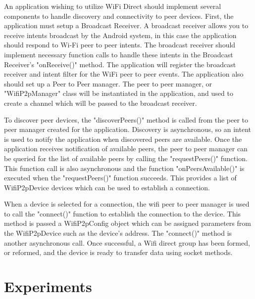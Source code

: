 \documentclass[10pt,twocolumn]{article}
\begin{document}
An application wishing to utilize WiFi Direct should implement several components to handle discovery and connectivity to peer devices.
First, the application must setup a Broadcast Receiver. 
A broadcast receiver allows you to receive intents broadcast by the Android system, in this case the application should respond to Wi-Fi peer to peer intents.
The broadcast receiver should implement necessary function calls to handle these intents in the Broadcast Receiver's "onReceive()" method.
The application will register the broadcast receiver and intent filter for the WiFi peer to peer events.
The application also should set up a Peer to Peer manager. 
The peer to peer manager, or "WifiP2pManager" class will be instantiated in the application, and used to create a channel which will be passed to the broadcast receiver.

To discover peer devices, the "discoverPeers()" method is called from the peer to peer manager created for the application.
Discovery is asynchronous, so an intent is used to notify the application when discovered peers are available.
Once the application receives notification of available peers, the peer to peer manager can be queried for the list of available peers by calling the "requestPeers()" function. 
This function call is also asynchronous and the function "onPeersAvailable()" is executed when the "requestPeers()" function succeeds. 
This provides a list of WifiP2pDevice devices which can be used to establish a connection. \cite{androidp2p}

When a device is selected for a connection, the wifi peer to peer manager is used to call the "connect()" function to establish the connection to the device. 
This method is passed a WifiP2pConfig object which can be assigned parameters from the WifiP2pDevice such as the device's address.
The "connect()" method is another asynchronous call. 
Once successful, a Wifi direct group has been formed, or reformed, and the device is ready to transfer data using socket methods.

\section{Experiments}
\end{document}
